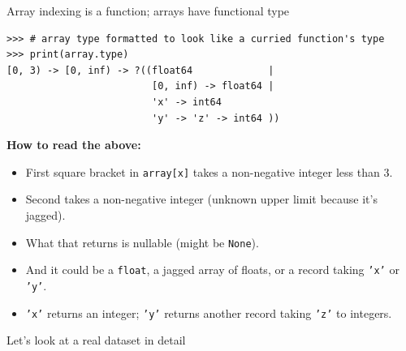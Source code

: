 \documentclass[aspectratio=169]{beamer}
\begin{document}
\begin{frame}[fragile]{Array indexing is a function; arrays have functional type}
\small
\begin{verbatim}
>>> # array type formatted to look like a curried function's type
>>> print(array.type)
[0, 3) -> [0, inf) -> ?((float64             |
                         [0, inf) -> float64 |
                         'x' -> int64
                         'y' -> 'z' -> int64 ))
\end{verbatim}

\normalsize
\vspace{0.5 cm}
{\bf How to read the above:}
\begin{itemize}
\item First square bracket in \texttt{array[x]} takes a non-negative integer less than 3.
\item Second takes a non-negative integer (unknown upper limit because it's jagged).
\item What that returns is nullable (might be \texttt{None}).
\item And it could be a \texttt{float}, a jagged array of floats, or a record taking \texttt{'x'} or \texttt{'y'}.
\item \texttt{'x'} returns an integer; \texttt{'y'} returns another record taking \texttt{'z'} to integers.
\end{itemize}
\end{frame}

\begin{frame}{}
\LARGE
\vspace{1 cm}
\begin{center}
Let's look at a real dataset in detail
\end{center}
\end{frame}
\end{document}
